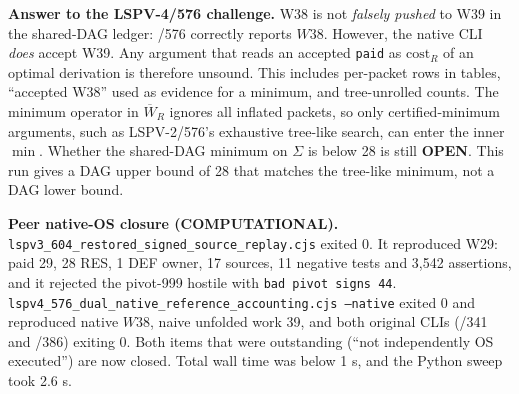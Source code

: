 \documentclass[11pt]{article}
\begin{document}
\textbf{Answer to the LSPV-4/576 challenge.} W38 is not \emph{falsely pushed} to W39 in
the shared-DAG ledger: /576 correctly reports $W38$. However, the native CLI \emph{does}
accept W39. Any argument that reads an accepted \texttt{paid} as $\mathrm{cost}_R$ of an
optimal derivation is therefore unsound. This includes per-packet rows in tables,
``accepted W38'' used as evidence for a minimum, and tree-unrolled counts.
The minimum operator in $\overline W_R$ ignores all inflated packets, so only
certified-minimum arguments, such as LSPV-2/576's exhaustive tree-like search, can enter
the inner $\min$. Whether the shared-DAG minimum on $\Sigma$ is below 28 is still
\textbf{OPEN}. This run gives a DAG upper bound of 28 that matches the tree-like minimum,
not a DAG lower bound.

\textbf{Peer native-OS closure (COMPUTATIONAL).}
\texttt{lspv3\_604\_restored\_signed\_source\_replay.cjs} exited 0. It reproduced
W29: paid 29, 28 RES, 1 DEF owner, 17 sources, 11 negative tests and 3,542 assertions,
and it rejected the pivot-999 hostile with \texttt{bad pivot signs 44}.
\texttt{lspv4\_576\_dual\_native\_reference\_accounting.cjs --native} exited 0 and
reproduced native $W38$, naive unfolded work 39, and both original CLIs (/341 and /386)
exiting 0. Both items that were outstanding (``not independently OS executed'') are now
closed. Total wall time was below 1 s, and the Python sweep took 2.6 s.
\end{document}
